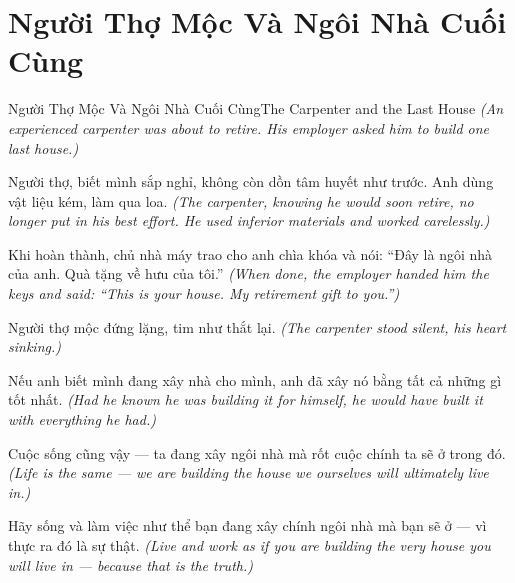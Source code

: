 \section{Người Thợ Mộc Và Ngôi Nhà Cuối Cùng}
\begin{truyen}{Người Thợ Mộc Và Ngôi Nhà Cuối Cùng}{The Carpenter and the Last House}
\textit{(An experienced carpenter was about to retire. His employer asked him to build one last house.)}

Người thợ, biết mình sắp nghỉ, không còn dồn tâm huyết như trước. Anh dùng vật liệu kém, làm qua loa.
\textit{(The carpenter, knowing he would soon retire, no longer put in his best effort. He used inferior materials and worked carelessly.)}

Khi hoàn thành, chủ nhà máy trao cho anh chìa khóa và nói: ``Đây là ngôi nhà của anh. Quà tặng về hưu của tôi.''
\textit{(When done, the employer handed him the keys and said: ``This is your house. My retirement gift to you.'')}

Người thợ mộc đứng lặng, tim như thắt lại.
\textit{(The carpenter stood silent, his heart sinking.)}

Nếu anh biết mình đang xây nhà cho mình, anh đã xây nó bằng tất cả những gì tốt nhất.
\textit{(Had he known he was building it for himself, he would have built it with everything he had.)}

Cuộc sống cũng vậy — ta đang xây ngôi nhà mà rốt cuộc chính ta sẽ ở trong đó.
\textit{(Life is the same — we are building the house we ourselves will ultimately live in.)}

\end{truyen}

\begin{baihoc}
Hãy sống và làm việc như thể bạn đang xây chính ngôi nhà mà bạn sẽ ở — vì thực ra đó là sự thật.
\textit{(Live and work as if you are building the very house you will live in — because that is the truth.)}
\end{baihoc}
\ngancach


